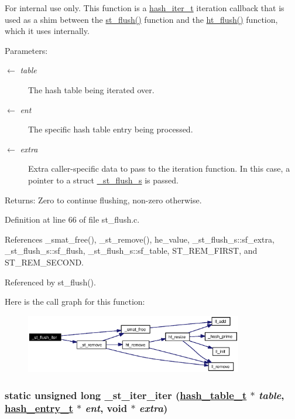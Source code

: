 \begin{Desc}
\item[For internal use only.]
This function is a \hyperlink{group__dbprim__hash_ga3}{hash\_\-iter\_\-t} iteration callback that is used as a shim between the \hyperlink{group__dbprim__smat_ga15}{st\_\-flush()} function and the \hyperlink{group__dbprim__hash_ga16}{ht\_\-flush()} function, which it uses internally.

\begin{Desc}
\item[Parameters:]
\begin{description}
\item[\mbox{$\leftarrow$} {\em table}]The hash table being iterated over. \item[\mbox{$\leftarrow$} {\em ent}]The specific hash table entry being processed. \item[\mbox{$\leftarrow$} {\em extra}]Extra caller-specific data to pass to the iteration function. In this case, a pointer to a struct \hyperlink{struct__st__flush__s}{\_\-st\_\-flush\_\-s} is passed.\end{description}
\end{Desc}
\begin{Desc}
\item[Returns:]Zero to continue flushing, non-zero otherwise.\end{Desc}
\end{Desc}


Definition at line 66 of file st\_\-flush.c.

References \_\-smat\_\-free(), \_\-st\_\-remove(), he\_\-value, \_\-st\_\-flush\_\-s::sf\_\-extra, \_\-st\_\-flush\_\-s::sf\_\-flush, \_\-st\_\-flush\_\-s::sf\_\-table, ST\_\-REM\_\-FIRST, and ST\_\-REM\_\-SECOND.

Referenced by st\_\-flush().

Here is the call graph for this function:\begin{figure}[H]
\begin{center}
\leavevmode
\includegraphics[width=269pt]{group__dbprim__smat_ga30_cgraph}
\end{center}
\end{figure}
\hypertarget{group__dbprim__smat_ga31}{
\subsubsection[\_\-st\_\-iter\_\-iter]{\setlength{\rightskip}{0pt plus 5cm}static unsigned long \_\-st\_\-iter\_\-iter (\hyperlink{struct__hash__table__s}{hash\_\-table\_\-t} $\ast$ {\em table}, \hyperlink{struct__hash__entry__s}{hash\_\-entry\_\-t} $\ast$ {\em ent}, void $\ast$ {\em extra})}}
\label{group__dbprim__smat_ga31}


